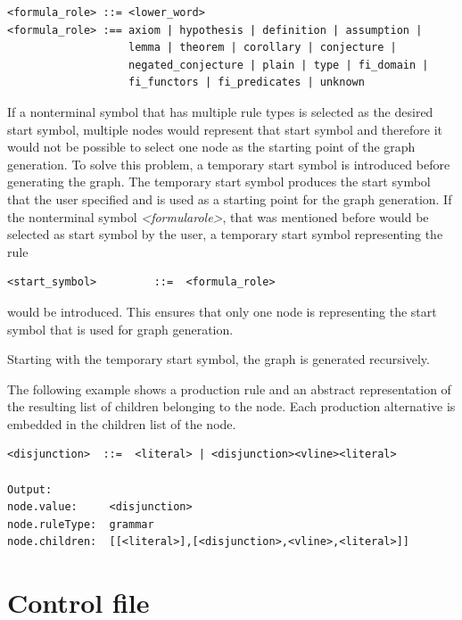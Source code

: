 \begin{lstlisting}[caption= Productions of the nonterminal symbol \textit{<formula\textunderscore role>}, label=lst:ConceptMultipleRules]
<formula_role> ::= <lower_word>
<formula_role> :== axiom | hypothesis | definition | assumption |
                   lemma | theorem | corollary | conjecture |
                   negated_conjecture | plain | type | fi_domain | 
                   fi_functors | fi_predicates | unknown
\end{lstlisting}

If a nonterminal symbol that has multiple rule types is selected as the desired start symbol, multiple nodes would represent that start symbol and therefore it would not be possible to select one node as the starting point of the graph generation.
To solve this problem, a temporary start symbol is introduced before generating the graph.
The temporary start symbol produces the start symbol that the user specified and is used as a starting point for the graph generation.
If the nonterminal symbol \textit{<formula\textunderscore role>}, that was mentioned before would be selected as start symbol by the user, a temporary start symbol representing the rule
\begin{verbatim}
<start_symbol>         ::=  <formula_role>
\end{verbatim}
would be introduced.
This ensures that only one node is representing the start symbol that is used for graph generation.

Starting with the temporary start symbol, the graph is generated recursively.

The following example shows a production rule and an abstract representation of the resulting list of children belonging to the node. Each production alternative is embedded in the children list of the node. %

\begin{verbatim}
<disjunction>  ::=  <literal> | <disjunction><vline><literal>

Output:
node.value:     <disjunction>
node.ruleType:  grammar
node.children:  [[<literal>],[<disjunction>,<vline>,<literal>]]
\end{verbatim}

\section{Control file}\label{sec:ConceptControlFile}

